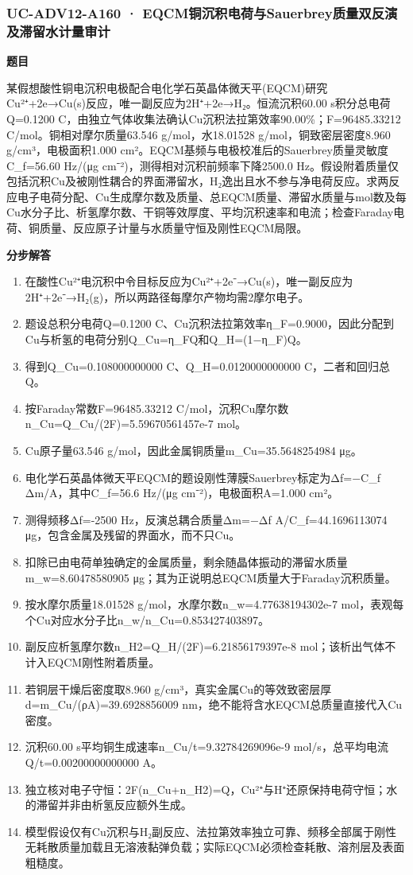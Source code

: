 \documentclass[UTF8,11pt,a4paper]{ctexart}
\begin{document}
\subsubsection*{UC-ADV12-A160 · EQCM铜沉积电荷与Sauerbrey质量双反演及滞留水计量审计}
\noindent\textbf{题目}\par
某假想酸性铜电沉积电极配合电化学石英晶体微天平(EQCM)研究Cu²⁺+2e→Cu(s)反应，唯一副反应为2H⁺+2e→H₂。恒流沉积60.00 s积分总电荷Q=0.1200 C，由独立气体收集法确认Cu沉积法拉第效率90.00\%；F=96485.33212 C/mol。铜相对摩尔质量63.546 g/mol，水18.01528 g/mol，铜致密层密度8.960 g/cm³，电极面积1.000 cm²。EQCM基频与电极校准后的Sauerbrey质量灵敏度C\_f=56.60 Hz/(μg cm⁻²)，测得相对沉积前频率下降2500.0 Hz。假设附着质量仅包括沉积Cu及被刚性耦合的界面滞留水，H₂逸出且水不参与净电荷反应。求两反应电子电荷分配、Cu生成摩尔数及质量、总EQCM质量、滞留水质量与mol数及每Cu水分子比、析氢摩尔数、干铜等效厚度、平均沉积速率和电流；检查Faraday电荷、铜质量、反应原子计量与水质量守恒及刚性EQCM局限。\par
\medskip\noindent\textbf{分步解答}
\begin{enumerate}
\item 在酸性Cu²⁺电沉积中令目标反应为Cu²⁺+2e⁻→Cu(s)，唯一副反应为2H⁺+2e⁻→H₂(g)，所以两路径每摩尔产物均需2摩尔电子。
\item 题设总积分电荷Q=0.1200 C、Cu沉积法拉第效率η\_F=0.9000，因此分配到Cu与析氢的电荷分别Q\_Cu=η\_FQ和Q\_H=(1−η\_F)Q。
\item 得到Q\_Cu=0.108000000000 C、Q\_H=0.0120000000000 C，二者和回归总Q。
\item 按Faraday常数F=96485.33212 C/mol，沉积Cu摩尔数n\_Cu=Q\_Cu/(2F)=5.59670561457e-7 mol。
\item Cu原子量63.546 g/mol，因此金属铜质量m\_Cu=35.5648254984 μg。
\item 电化学石英晶体微天平EQCM的题设刚性薄膜Sauerbrey标定为Δf=−C\_f Δm/A，其中C\_f=56.6 Hz/(μg cm⁻²)，电极面积A=1.000 cm²。
\item 测得频移Δf=-2500 Hz，反演总耦合质量Δm=−Δf A/C\_f=44.1696113074 μg，包含金属及残留的界面水，而不只Cu。
\item 扣除已由电荷单独确定的金属质量，剩余随晶体振动的滞留水质量m\_w=8.60478580905 μg；其为正说明总EQCM质量大于Faraday沉积质量。
\item 按水摩尔质量18.01528 g/mol，水摩尔数n\_w=4.77638194302e-7 mol，表观每个Cu对应水分子比n\_w/n\_Cu=0.853427403897。
\item 副反应析氢摩尔数n\_H2=Q\_H/(2F)=6.21856179397e-8 mol；该析出气体不计入EQCM刚性附着质量。
\item 若铜层干燥后密度取8.960 g/cm³，真实金属Cu的等效致密层厚d=m\_Cu/(ρA)=39.6928856009 nm，绝不能将含水EQCM总质量直接代入Cu密度。
\item 沉积60.00 s平均铜生成速率n\_Cu/t=9.32784269096e-9 mol/s，总平均电流Q/t=0.00200000000000 A。
\item 独立核对电子守恒：2F(n\_Cu+n\_H2)=Q，Cu²⁺与H⁺还原保持电荷守恒；水的滞留并非由析氢反应额外生成。
\item 模型假设仅有Cu沉积与H₂副反应、法拉第效率独立可靠、频移全部属于刚性无耗散质量加载且无溶液黏弹负载；实际EQCM必须检查耗散、溶剂层及表面粗糙度。
\end{enumerate}
\end{document}
